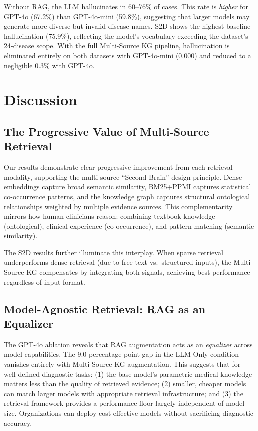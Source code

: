 \documentclass[preprint,12pt]{elsarticle}
\begin{document}
Without RAG, the LLM hallucinates in 60--76\% of cases. This rate is \emph{higher} for GPT-4o (67.2\%) than GPT-4o-mini (59.8\%), suggesting that larger models may generate more diverse but invalid disease names. S2D shows the highest baseline hallucination (75.9\%), reflecting the model's vocabulary exceeding the dataset's 24-disease scope. With the full Multi-Source KG pipeline, hallucination is eliminated entirely on both datasets with GPT-4o-mini (0.000) and reduced to a negligible 0.3\% with GPT-4o.

\section{Discussion}
\label{sec:discussion}

\subsection{The Progressive Value of Multi-Source Retrieval}

Our results demonstrate clear progressive improvement from each retrieval modality, supporting the multi-source ``Second Brain'' design principle. Dense embeddings capture broad semantic similarity, BM25+PPMI captures statistical co-occurrence patterns, and the knowledge graph captures structural ontological relationships weighted by multiple evidence sources. This complementarity mirrors how human clinicians reason: combining textbook knowledge (ontological), clinical experience (co-occurrence), and pattern matching (semantic similarity).

The S2D results further illuminate this interplay. When sparse retrieval underperforms dense retrieval (due to free-text vs.\ structured inputs), the Multi-Source KG compensates by integrating both signals, achieving best performance regardless of input format.

\subsection{Model-Agnostic Retrieval: RAG as an Equalizer}

The GPT-4o ablation reveals that RAG augmentation acts as an \emph{equalizer} across model capabilities. The 9.0-percentage-point gap in the LLM-Only condition vanishes entirely with Multi-Source KG augmentation. This suggests that for well-defined diagnostic tasks: (1) the base model's parametric medical knowledge matters less than the quality of retrieved evidence; (2) smaller, cheaper models can match larger models with appropriate retrieval infrastructure; and (3) the retrieval framework provides a performance floor largely independent of model size. Organizations can deploy cost-effective models without sacrificing diagnostic accuracy.
\end{document}
